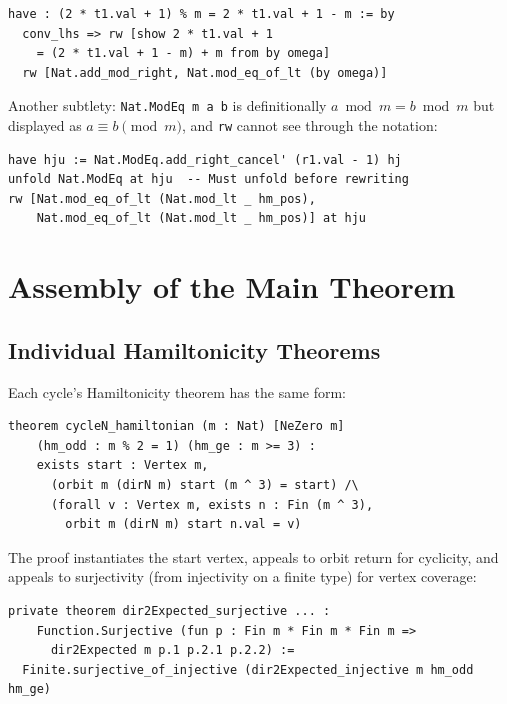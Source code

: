 \documentclass[11pt,a4paper]{article}
\begin{document}
\begin{lstlisting}[caption={Working around omega's limitations}]
have : (2 * t1.val + 1) % m = 2 * t1.val + 1 - m := by
  conv_lhs => rw [show 2 * t1.val + 1
    = (2 * t1.val + 1 - m) + m from by omega]
  rw [Nat.add_mod_right, Nat.mod_eq_of_lt (by omega)]
\end{lstlisting}

Another subtlety: \texttt{Nat.ModEq m a b} is definitionally $a \bmod m = b \bmod m$
but displayed as $a \equiv b \pmod{m}$, and \texttt{rw} cannot see through the notation:

\begin{lstlisting}[caption={Unfolding Nat.ModEq}]
have hju := Nat.ModEq.add_right_cancel' (r1.val - 1) hj
unfold Nat.ModEq at hju  -- Must unfold before rewriting
rw [Nat.mod_eq_of_lt (Nat.mod_lt _ hm_pos),
    Nat.mod_eq_of_lt (Nat.mod_lt _ hm_pos)] at hju
\end{lstlisting}

\section{Assembly of the Main Theorem}
\label{sec:assembly}

\subsection{Individual Hamiltonicity Theorems}

Each cycle's Hamiltonicity theorem has the same form:

\begin{lstlisting}[caption={Cycle Hamiltonicity (pattern)}]
theorem cycleN_hamiltonian (m : Nat) [NeZero m]
    (hm_odd : m % 2 = 1) (hm_ge : m >= 3) :
    exists start : Vertex m,
      (orbit m (dirN m) start (m ^ 3) = start) /\
      (forall v : Vertex m, exists n : Fin (m ^ 3),
        orbit m (dirN m) start n.val = v)
\end{lstlisting}

The proof instantiates the start vertex, appeals to orbit return for cyclicity,
and appeals to surjectivity (from injectivity on a finite type) for vertex coverage:

\begin{lstlisting}[caption={Surjectivity from injectivity on finite types}]
private theorem dir2Expected_surjective ... :
    Function.Surjective (fun p : Fin m * Fin m * Fin m =>
      dir2Expected m p.1 p.2.1 p.2.2) :=
  Finite.surjective_of_injective (dir2Expected_injective m hm_odd hm_ge)
\end{lstlisting}
\end{document}
